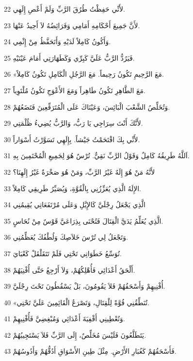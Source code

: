 \par 22 لأَنِّي حَفِظْتُ طُرُقَ الرَّبِّ وَلَمْ أَعْصِ إِلَهِي.
\par 23 لأَنَّ جَمِيعَ أَحْكَامِهِ أَمَامِي وَفَرَائِضُهُ لاَ أَحِيدُ عَنْهَا.
\par 24 وَأَكُونُ كَامِلاً لَدَيْهِ وَأَتَحَفَّظُ مِنْ إِثْمِي.
\par 25 فَيَرُدُّ الرَّبُّ عَلَيَّ كَبِرِّي وَكَطَهَارَتِي أَمَامَ عَيْنَيْهِ.
\par 26 «مَعَ الرَّحِيمِ تَكُونُ رَحِيماً. مَعَ الرَّجُلِ الْكَامِلِ تَكُونُ كَامِلاً.
\par 27 مَعَ الطَّاهِرِ تَكُونُ طَاهِراً وَمَعَ الأَعْوَجِ تَكُونُ مُلْتَوِياً.
\par 28 وَتُخَلِّصُ الشَّعْبَ الْبَائِسَ، وَعَيْنَاكَ عَلَى الْمُتَرَفِّعِينَ فَتَضَعُهُمْ.
\par 29 لأَنَّكَ أَنْتَ سِرَاجِي يَا رَبُّ، وَالرَّبُّ يُضِيءُ ظُلْمَتِي.
\par 30 لأَنِّي بِكَ اقْتَحَمْتُ جَيْشاً. بِإِلَهِي تَسَوَّرْتُ أَسْوَاراً.
\par 31 اَللَّهُ طَرِيقُهُ كَامِلٌ وَقَوْلُ الرَّبِّ نَقِيٌّ. تُرْسٌ هُوَ لِجَمِيعِ الْمُحْتَمِينَ بِهِ.
\par 32 لأَنَّهُ مَنْ هُوَ إِلَهٌ غَيْرُ الرَّبِّ، وَمَنْ هُوَ صَخْرَةٌ غَيْرُ إِلَهِنَا؟
\par 33 الإِلَهُ الَّذِي يُعَزِّزُنِي بِالْقُوَّةِ، وَيُصَيِّرُ طَرِيقِي كَامِلاً.
\par 34 الَّذِي يَجْعَلُ رِجْلَيَّ كَالإِيَّلِ وَعَلَى مُرْتَفَعَاتِي يُقِيمُنِي
\par 35 الَّذِي يُعَلِّمُ يَدَيَّ الْقِتَالَ فَتُحْنَى بِذِرَاعَيَّ قَوْسٌ مِنْ نُحَاسٍ.
\par 36 وَتَجْعَلُ لِي تُرْسَ خَلاَصِكَ وَلُطْفُكَ يُعَظِّمُنِي.
\par 37 تُوَسِّعُ خَطَوَاتِي تَحْتِي فَلَمْ تَتَقَلْقَلْ كَعْبَايَ.
\par 38 أَلْحَقُ أَعْدَائِي فَأُهْلِكُهُمْ، وَلاَ أَرْجِعُ حَتَّى أُفْنِيَهُمْ.
\par 39 أُفْنِيهِمْ وَأَسْحَقُهُمْ فَلاَ يَقُومُونَ، بَلْ يَسْقُطُونَ تَحْتَ رِجْلَيَّ.
\par 40 «تُنَطِّقُنِي قُوَّةً لِلْقِتَالِ، وَتَصْرَعُ الْقَائِمِينَ عَلَيَّ تَحْتِي.
\par 41 وَتُعْطِينِي أَقْفِيَةَ أَعْدَائِي وَمُبْغِضِيَّ فَأُفْنِيهِمْ.
\par 42 يَتَطَلَّعُونَ فَلَيْسَ مُخَلِّصٌ، إِلَى الرَّبِّ فَلاَ يَسْتَجِيبُهُمْ.
\par 43 فَأَسْحَقُهُمْ كَغُبَارِ الأَرْضِ. مِثْلَ طِينِ الأَسْوَاقِ أَدُقُّهُمْ وَأَدُوسُهُمْ.
